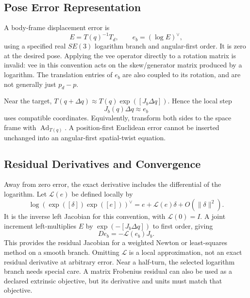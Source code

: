 \subsection{Pose Error Representation}
\label{subsec:pose_error}

A body-frame displacement error is
\begin{equation}
 E=T(q)^{-1}T_d,\qquad e_b=(\log E)^\vee,
\end{equation}
using a specified real $SE(3)$ logarithm branch and angular-first order. It is zero at the desired pose. Applying the vee operator directly to a rotation matrix is invalid: vee in this convention acts on the skew/generator matrix produced by a logarithm. The translation entries of $e_b$ are also coupled to its rotation, and are not generally just $p_d-p$.

Near the target, $T(q+\Delta q)\approx T(q)\exp([J_b\Delta q])$. Hence the local step
\begin{equation}
 \label{subsec:newton_raphson}
 J_b(q)\Delta q\approx e_b
\end{equation}
uses compatible coordinates. Equivalently, transform both sides to the space frame with $\operatorname{Ad}_{T(q)}$. A position-first Euclidean error cannot be inserted unchanged into an angular-first spatial-twist equation.

\subsection{Residual Derivatives and Convergence}

Away from zero error, the exact derivative includes the differential of the logarithm. Let $\mathcal L(e)$ be defined locally by
\begin{equation}
 \log\!\left(\exp([\delta])\exp([e])\right)^\vee
 =e+\mathcal L(e)\delta+O(\|\delta\|^2).
\end{equation}
It is the inverse left Jacobian for this convention, with $\mathcal L(0)=I$. A joint increment left-multiplies $E$ by $\exp(-[J_b\Delta q])$ to first order, giving
\begin{equation}
 De_b=-\mathcal L(e_b)J_b.
\end{equation}
This provides the residual Jacobian for a weighted Newton or least-squares method on a smooth branch. Omitting $\mathcal L$ is a local approximation, not an exact residual derivative at arbitrary error. Near a half-turn, the selected logarithm branch needs special care. A matrix Frobenius residual can also be used as a declared extrinsic objective, but its derivative and units must match that objective.

